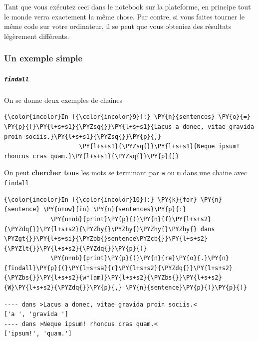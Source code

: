 Tant que vous exécutez ceci dans le notebook sur la plateforme, en
principe tout le monde verra exactement la même chose. Par contre, si
vous faites tourner le même code sur votre ordinateur, il se peut que
vous obteniez des résultats légèrement différents.

    \hypertarget{un-exemple-simple}{%
\subsubsection{Un exemple simple}\label{un-exemple-simple}}

    \hypertarget{findall}{%
\subparagraph{\texorpdfstring{\texttt{findall}}{findall}}\label{findall}}

    On se donne deux exemples de chaines

    \begin{Verbatim}[commandchars=\\\{\}]
{\color{incolor}In [{\color{incolor}9}]:} \PY{n}{sentences} \PY{o}{=} \PY{p}{[}\PY{l+s+s1}{\PYZsq{}}\PY{l+s+s1}{Lacus a donec, vitae gravida proin sociis.}\PY{l+s+s1}{\PYZsq{}}\PY{p}{,} 
                     \PY{l+s+s1}{\PYZsq{}}\PY{l+s+s1}{Neque ipsum! rhoncus cras quam.}\PY{l+s+s1}{\PYZsq{}}\PY{p}{]}
\end{Verbatim}


    On peut \textbf{chercher tous} les mots se terminant par \texttt{a} ou
\texttt{m} dans une chaine avec \texttt{findall}

    \begin{Verbatim}[commandchars=\\\{\}]
{\color{incolor}In [{\color{incolor}10}]:} \PY{k}{for} \PY{n}{sentence} \PY{o+ow}{in} \PY{n}{sentences}\PY{p}{:}
             \PY{n+nb}{print}\PY{p}{(}\PY{n}{f}\PY{l+s+s2}{\PYZdq{}}\PY{l+s+s2}{\PYZhy{}\PYZhy{}\PYZhy{}\PYZhy{} dans \PYZgt{}}\PY{l+s+si}{\PYZob{}sentence\PYZcb{}}\PY{l+s+s2}{\PYZlt{}}\PY{l+s+s2}{\PYZdq{}}\PY{p}{)}
             \PY{n+nb}{print}\PY{p}{(}\PY{n}{re}\PY{o}{.}\PY{n}{findall}\PY{p}{(}\PY{l+s+sa}{r}\PY{l+s+s2}{\PYZdq{}}\PY{l+s+s2}{\PYZbs{}}\PY{l+s+s2}{w*[am]}\PY{l+s+s2}{\PYZbs{}}\PY{l+s+s2}{W}\PY{l+s+s2}{\PYZdq{}}\PY{p}{,} \PY{n}{sentence}\PY{p}{)}\PY{p}{)}
\end{Verbatim}


    \begin{Verbatim}[commandchars=\\\{\}]
---- dans >Lacus a donec, vitae gravida proin sociis.<
['a ', 'gravida ']
---- dans >Neque ipsum! rhoncus cras quam.<
['ipsum!', 'quam.']

    \end{Verbatim}

